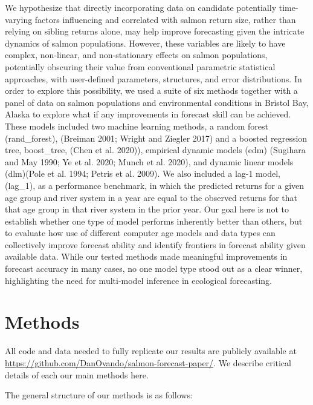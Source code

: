 \documentclass[
]{article}
\begin{document}
We hypothesize that directly incorporating data on candidate potentially time-varying factors influencing and correlated with salmon return size, rather than relying on sibling returns alone, may help improve forecasting given the intricate dynamics of salmon populations. However, these variables are likely to have complex, non-linear, and non-stationary effects on salmon populations, potentially obscuring their value from conventional parametric statistical approaches, with user-defined parameters, structures, and error distributions. In order to explore this possibility, we used a suite of six methods together with a panel of data on salmon populations and environmental conditions in Bristol Bay, Alaska to explore what if any improvements in forecast skill can be achieved. These models included two machine learning methods, a random forest (rand\_forest), (Breiman 2001; Wright and Ziegler 2017) and a boosted regression tree, boost\_tree, (Chen et al. 2020)), empirical dynamic models (edm) (Sugihara and May 1990; Ye et al. 2020; Munch et al. 2020), and dynamic linear models (dlm)(Pole et al. 1994; Petris et al. 2009). We also included a lag-1 model, (lag\_1), as a performance benchmark, in which the predicted returns for a given age group and river system in a year are equal to the observed returns for that that age group in that river system in the prior year. Our goal here is not to establish whether one type of model performs inherently better than others, but to evaluate how use of different computer age models and data types can collectively improve forecast ability and identify frontiers in forecast ability given available data. While our tested methods made meaningful improvements in forecast accuracy in many cases, no one model type stood out as a clear winner, highlighting the need for multi-model inference in ecological forecasting.

\hypertarget{methods}{%
\section*{Methods}\label{methods}}

All code and data needed to fully replicate our results are publicly available at \url{https://github.com/DanOvando/salmon-forecast-paper/}. We describe critical details of each our main methods here.

The general structure of our methods is as follows:
\end{document}
